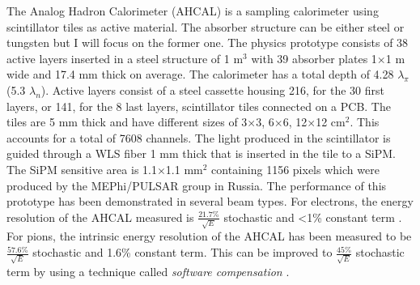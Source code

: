 The Analog Hadron Calorimeter (AHCAL) is a sampling calorimeter using scintillator tiles as active material. The absorber structure can be either steel or tungsten but I will focus on the former one. The physics prototype \cite{1748-0221-5-05-P05004} consists of 38 active layers inserted in a steel structure of 1 m$^3$ with 39 absorber plates 1$\times$1 m wide and 17.4 mm thick on average. The calorimeter has a total depth of 4.28 $\lambda_{\pi}$ (5.3 $\lambda_{n}$). Active layers consist of a steel cassette housing 216, for the 30 first layers, or 141, for the 8 last layers, scintillator tiles connected on a PCB. The tiles are 5 mm thick and have different sizes of 3$\times$3, 6$\times$6, 12$\times$12 cm$^2$. This accounts for a total of 7608 channels. The light produced in the scintillator is guided through a WLS fiber 1 mm thick that is inserted in the tile to a SiPM. The SiPM sensitive area is 1.1$\times$1.1 mm$^2$ containing 1156 pixels which were produced by the MEPhi/PULSAR group in Russia. The performance of this prototype has been demonstrated in several beam types. For electrons, the energy resolution of the AHCAL measured is $\frac{21.7\%}{\sqrt{E}}$ stochastic and <1\% constant term \cite{CAN034}. For pions, the intrinsic energy resolution of the AHCAL has been measured to be $\frac{57.6\%}{\sqrt{E}}$ stochastic and 1.6\% constant term. This can be improved to $\frac{45\%}{\sqrt{E}}$ stochastic term by using a technique called \textit{software compensation} \cite{SoftCompNew2012}.

